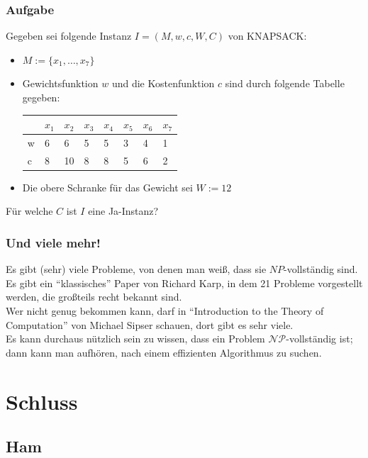 \begin{frame}
\frametitle{Aufgabe}
Gegeben sei folgende Instanz $I=(M, w, c, W, C)$ von KNAPSACK:

\begin{itemize}
\item $M := \{x_1, \ldots, x_7\}$
\item Gewichtsfunktion $w$ und die Kostenfunktion $c$ sind durch folgende Tabelle gegeben:

\begin{center}
\begin{tabular}{l|l|l|l|l|l|l|l}
	  &$x_1$ &$x_2$ &$x_3$ 	&$x_4$ 	&$x_5$ 	&$x_6$ 	&$x_7$\\ 	
  \hline
	w &6	 &6	&5	&5	&3	&4	&1\\
  \hline
	c &8	 &10	&8	&8	&5	&6	&2\\
\end{tabular}
\end{center}
\item Die obere Schranke für das Gewicht sei $W:=12$
\end{itemize}

Für welche $C$ ist $I$ eine Ja-Instanz?  
\end{frame}

\begin{frame}
\frametitle{Und viele mehr!}
Es gibt (sehr) viele Probleme, von denen man weiß, dass sie $NP$-vollständig sind. Es gibt ein "`klassisches"' Paper von Richard Karp, in dem 21 Probleme vorgestellt werden, die großteils recht bekannt sind.\\
Wer nicht genug bekommen kann, darf in "`Introduction to the Theory of Computation"' von Michael Sipser schauen, dort gibt es sehr viele.\\[10pt]
Es kann durchaus nützlich sein zu wissen, dass ein Problem $\mathcal{NP}$-vollständig ist; dann kann man aufhören, nach einem effizienten Algorithmus zu suchen.
\end{frame}

\section{Schluss}
\subsection{Ham}

